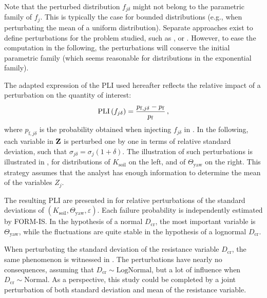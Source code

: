 Note that the perturbed distribution $f_{j \delta}$ might not belong to the parametric family of $f_j$. 
This is typically the case for bounded distributions (e.g., when perturbating the mean of a uniform distribution). 
Separate approaches exist to define perturbations for the problem studied, such as \citet{lemaitre_2015_PLI}, or \citet{gauchy_2022_PLI}. 
However, to ease the computation in the following, the perturbations will conserve the initial parametric family (which seems reasonable for distributions in the exponential family). 

The adapted expression of the PLI used hereafter \citep{gauchy_2022_PLI} reflects the relative impact of a perturbation on the quantity of interest: 
\begin{equation}
    \mathrm{PLI}\left(f_{j \delta}\right) = \frac{p_{\mathrm{f}, j \delta} - p_\mathrm{f} }{p_\mathrm{f}} \,,
\end{equation}
where $p_{\mathrm{f}, j \delta}$ is the probability obtained when injecting $f_{j \delta}$ in .
In the following, each variable in ${\bf Z}$ is perturbed one by one in terms of relative standard deviation, such that $\sigma_{j \delta} = \sigma_j (1+\delta)$. 
The illustration of such perturbations is illustrated in , for distributions of $K_{\mathrm{soil}}$ on the left, and of $\Theta_{\mathrm{yaw}}$ on the right.
This strategy assumes that the analyst has enough information to determine the mean of the variables $Z_j$. 

The resulting PLI are presented in  for relative perturbations of the standard deviations of $(K_{\mathrm{soil}}, \Theta_{\mathrm{yaw}}, \varepsilon)$. 
Each failure probability is independently estimated by FORM-IS. 
In the hypothesis of a normal $D_{\mathrm{cr}}$, the most important variable is $\Theta_{\mathrm{yaw}}$, while the fluctuations are quite stable in the hypothesis of a lognormal $D_{\mathrm{cr}}$. 

When perturbating the standard deviation of the resistance variable $D_{\mathrm{cr}}$, the same phenomenon is witnessed in . 
The perturbations have nearly no consequences, assuming that $D_{\mathrm{cr}}\sim \mathrm{LogNormal}$, but a lot of influence when $D_{\mathrm{cr}}\sim \mathrm{Normal}$.  
As a perspective, this study could be completed by a joint perturbation of both standard deviation and mean of the resistance variable.


